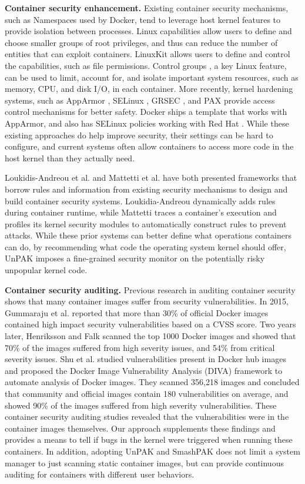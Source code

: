 \textbf{Container security enhancement.} 
Existing container security mechanisms, such as Namespaces \cite{namespaces} used by Docker, tend to leverage host kernel features to provide isolation between processes. 
Linux capabilities \cite{linux-kernel-capabilities} allow users to define and choose smaller groups of root privileges, and thus can reduce the number of entities that can exploit  containers. 
LinuxKit allows users to define and control the capabilities, such as file permissions. 
Control groups \cite{cgroups}, a key Linux feature, can be used to limit, account for, and isolate important system resources, such as memory, CPU, and disk I/O, in  each container. 
More recently, kernel hardening systems,  such as AppArmor \cite{AppArmor}, SELinux \cite{SELinux}, GRSEC \cite{GRSEC}, and PAX \cite{PAX} provide access control mechanisms for better safety. 
Docker ships a template that works with AppArmor, and also has SELinux policies working with Red Hat \cite{red-hat}. 
While these existing approaches do help improve security, their settings can be hard to configure, and current systems often allow containers to access more code in the host kernel than they actually need. 

Loukidis-Andreou et al. \cite{8416432} and Mattetti et al. \cite{7346869} have both presented frameworks that borrow rules and information from existing security mechanisms to design 
and build container security systems. Loukidia-Andreou dynamically adds rules during container runtime, while Mattetti traces a container’s execution and profiles its kernel security modules to automatically construct rules to prevent attacks. While these prior systems can better define what operations containers can do, by recommending what code the operating system kernel should offer, 
UnPAK imposes a fine-grained security monitor on the potentially risky unpopular kernel code. 

\textbf{Container security auditing.} 
Previous research  in  auditing container security shows that many container images suffer from security vulnerabilities. 
In 2015, Gummaraju et al. \cite{Gummaraju} reported that more than 30\% of official Docker images contained high impact security vulnerabilities based on a CVSS score. 
Two years later, Henriksson and Falk \cite{Henriksson} scanned the top 1000 Docker images and showed that 70\% of the images suffered from high severity issues, and 54\% from critical severity issues. 
Shu et al. \cite{Shu} studied vulnerabilities present in Docker hub images and proposed the Docker Image Vulnerability Analysis (DIVA) framework to automate analysis of Docker images. 
They scanned 356,218 images and concluded that community and official images contain 180 vulnerabilities on average, and showed 90\% of the images suffered from high severity vulnerabilities. 
These container security auditing studies revealed that the vulnerabilities were in the container images themselves. 
Our approach supplements these findings and provides a means to tell if bugs in the kernel were triggered when running these containers. 
In addition, adopting UnPAK and SmashPAK does not limit a system manager to just scanning static container images, but can provide continuous auditing for containers with different user behaviors. 
